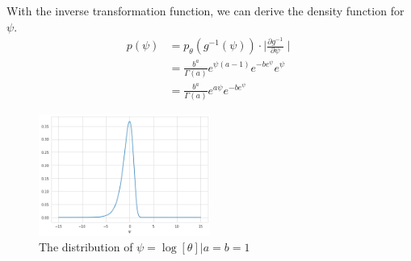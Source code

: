 \documentclass[11pt, letterpaper]{article}
\begin{document}
With the inverse transformation function, we can derive the density function for $\psi$.
\begin{align*}
    p(\psi) &= p_{\theta}(g^{-1}(\psi)) \cdot \mid \frac{\partial g^{-1}}{\partial \psi} \mid \\
      &= \frac{b^a}{\Gamma(a)} e^{\psi(a-1)} e^{-be^{\psi}} e^{\psi} \\
      &= \frac{b^a}{\Gamma(a)} e^{a\psi} e^{-be^{\psi}}
\end{align*}

\begin{figure}[h]
    \captionsetup{justification=centering, margin=2cm}
    \centering
    \includegraphics[width=0.5\textwidth]{hw2_3.10.b.png}
    \caption{The distribution of $\psi = \log[\theta]|a = b = 1$}
\end{figure}
\end{document}
